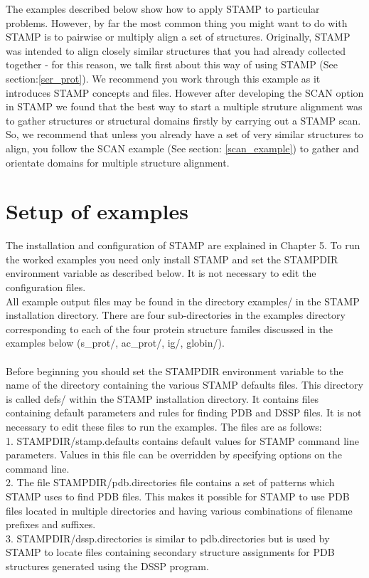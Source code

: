 The examples described below show how to apply STAMP to particular 
problems.   However, by far the most common thing you might want to do with STAMP is to pairwise or multiply align a set of structures.
Originally, STAMP was intended to align closely similar structures that you had 
already collected together - for this reason, we talk first about this way of 
using STAMP (See section:\ref{ser_prot}).  We recommend you work through this example as it introduces
STAMP concepts and files.  However after developing the SCAN option in STAMP we 
found that the best way to start a multiple struture alignment was to gather structures
or structural domains firstly by carrying out a STAMP scan.  So, we recommend that unless you 
already have a set of very similar structures to align, you follow the SCAN example (See section: \ref{scan_example}) to 
gather and orientate domains for multiple structure alignment.
\\
\section{Setup of examples}

The installation and configuration of STAMP are explained in Chapter 5. To run the
worked examples you need only install STAMP and set the STAMPDIR environment variable
as described below. It is not necessary to edit the configuration files. 
\\
All example output files may be found in the directory examples/ 
in the STAMP installation directory.   There are four sub-directories
in the examples directory corresponding to each of the four protein
structure familes discussed in the examples below (s\_prot/, ac\_prot/, ig/, globin/).\\
\\
Before beginning you should set the STAMPDIR environment variable to the name of the 
directory containing the various STAMP defaults files.  This directory is
called defs/ within the STAMP installation directory. It contains files containing
default parameters and rules for finding PDB and DSSP files. It is not necessary
to edit these files to run the examples. The files are as follows:\\

1. STAMPDIR/stamp.defaults contains default values for STAMP command line parameters.
Values in this file can be overridden by specifying options on the command line.
\\
2. The file STAMPDIR/pdb.directories file contains a set of patterns which STAMP
uses to find PDB files. This makes it possible for STAMP to use PDB files
located in multiple directories and having various combinations of filename prefixes
and suffixes.
\\
3. STAMPDIR/dssp.directories is similar to pdb.directories but is used by STAMP
to locate files containing secondary structure assignments for PDB structures
generated using the DSSP program.

